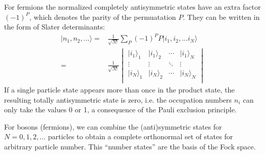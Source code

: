 \documentclass[oneside,11pt]{memoir}
\begin{document}
For fermions the normalized completely antisymmetric states have an extra
factor $(-1)^{P}$, which denotes the parity of the permuatation $P$.  They can
be written in the form of Slater determinants: \begin{equation}
\begin{split}
  | n_{1},  n_{2}, \ldots \rangle = &
  \frac{1}{\sqrt{N!}} \sum_{P} (- 1)^{P} P | i_{1},  i_{2}, \ldots i_{N} \rangle \\
  = &
  \frac{1}{\sqrt{N!}}
  \begin{vmatrix}
  |i_{1}\rangle_{1} & |i_{1}\rangle_{2} & \dotsm & |i_{1}\rangle_{N} \\
  \vdots &  \vdots &  \ddots   & \vdots \\
  |i_{N}\rangle_{1} & |i_{N}\rangle_{2} & \dotsm & |i_{N}\rangle_{N} \\
\end{vmatrix}
\end{split} 
  \label{eq:antisymmetrize} 
\end{equation}  
If a single particle state appears more than once in the product state, the
resulting totally antisymmetric state is zero,  i.e. the occupation numbers
$n_{i}$ can only take the values 0 or 1, a consequence of the Pauli exclusion
principle. 

For bosons (fermions), we can combine the (anti)symmetric states for
$N=0,1,2,\ldots$ particles to obtain a complete orthonormal set of states for
arbitrary particle number.  This ``number states'' are the basis of the Fock
space. 


\end{document}
